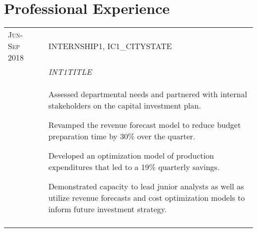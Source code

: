 \documentclass[a4paper,10pt]{article}
\begin{document}
\section{Professional Experience}
\begin{supertabular}{l p{0.55cm} p{13.9cm}}


	\textsc{Jun-Sep 2018}	&& \textsc{INTERNSHIP1}, IC1_CITYSTATE \\
												&& \small	\emph{INT1TITLE} \\
												&& \begin{enumerate*}[label =$\diamond$, itemjoin={\newline}]
                            \item \footnotesize Assessed departmental needs and partnered with internal stakeholders on the capital investment plan.
  													\item \footnotesize Revamped the revenue forecast model to reduce budget preparation time by 30\% over the quarter.
														\item \footnotesize Developed an optimization model of production expenditures that led to a 19\% quarterly savings.
  		                      \item \footnotesize Demonstrated capacity to lead junior analysts as well as utilize revenue forecasts and cost optimization models to inform future investment strategy.
													\end{enumerate*} \\
	 \\





\end{supertabular}
\end{document}
